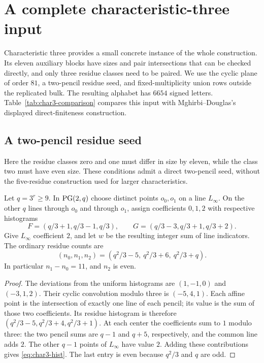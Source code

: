 \section{A complete characteristic-three input}\label{sec:char3}
Characteristic three provides a small concrete instance of the whole construction. Its eleven auxiliary blocks have sizes and pair intersections that can be checked directly, and only three residue classes need to be paired. We use the cyclic plane of order $81$, a two-pencil residue seed, and fixed-multiplicity union rows outside the replicated bulk. The resulting alphabet has $6654$ signed letters. Table~\ref{tab:char3-comparison} compares this input with Mghirbi--Douglas's displayed direct-finiteness construction.

\subsection{A two-pencil residue seed}

Here the residue classes zero and one must differ in size by eleven, while the class two must have even size. These conditions admit a direct two-pencil seed, without the five-residue construction used for larger characteristics.
\begin{lemma}\label{lem:char3-seed}
Let $q=3^r\ge9$. In $\operatorname{PG}(2,q)$ choose distinct points $o_0,o_1$ on a line $L_\infty$. On the other $q$ lines through $o_0$ and through $o_1$, assign coefficients $0,1,2$ with respective histograms
\[
 F=(q/3+1,q/3-1,q/3),\qquad
 G=(q/3-3,q/3+1,q/3+2).
\]
Give $L_\infty$ coefficient $2$, and let $w$ be the resulting integer sum of line indicators. The ordinary residue counts are
\begin{equation}\label{eq:char3-hist}
 (n_0,n_1,n_2)=(q^2/3-5,\ q^2/3+6,\ q^2/3+q).
\end{equation}
In particular $n_1-n_0=11$, and $n_2$ is even.
\end{lemma}
\begin{proof}
The deviations from the uniform histograms are $(1,-1,0)$ and $(-3,1,2)$. Their cyclic convolution modulo three is $(-5,4,1)$. Each affine point is the intersection of exactly one line of each pencil; its value is the sum of those two coefficients. Its residue histogram is therefore $(q^2/3-5,q^2/3+4,q^2/3+1)$. At each center the coefficients sum to $1$ modulo three: the two pencil sums are $q-1$ and $q+5$, respectively, and the common line adds $2$. The other $q-1$ points of $L_\infty$ have value $2$. Adding these contributions gives \eqref{eq:char3-hist}. The last entry is even because $q^2/3$ and $q$ are odd.
\end{proof}

